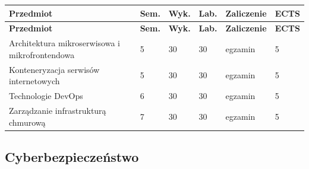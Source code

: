 \documentclass[12pt,a4paper]{article}
\newcommand{\thdrule}{\noalign{\global\setlength{\extrarowheight}{0pt}}}
\newcommand{\thdend}{\noalign{\global\setlength{\extrarowheight}{4pt}}}
\begin{document}
{\scriptsize
\begin{longtable}{m{6.5cm}m{0.7cm}m{1cm}m{1cm}m{1.7cm}m{0.7cm}}
\thdrule\toprule
\rowcolor{pjatkRed}
{\color{white}\footnotesize\textbf{\vphantom{Ag}Przedmiot}} & {\color{white}\footnotesize\textbf{\vphantom{Ag}Sem.}} & {\color{white}\footnotesize\textbf{\vphantom{Ag}Wyk.}} & {\color{white}\footnotesize\textbf{\vphantom{Ag}Lab.}} & {\color{white}\footnotesize\textbf{\vphantom{Ag}Zaliczenie}} & {\color{white}\footnotesize\textbf{\vphantom{Ag}ECTS}} \\
\midrule\thdend
\endfirsthead
\thdrule\toprule
\rowcolor{pjatkRed}
{\color{white}\footnotesize\textbf{\vphantom{Ag}Przedmiot}} & {\color{white}\footnotesize\textbf{\vphantom{Ag}Sem.}} & {\color{white}\footnotesize\textbf{\vphantom{Ag}Wyk.}} & {\color{white}\footnotesize\textbf{\vphantom{Ag}Lab.}} & {\color{white}\footnotesize\textbf{\vphantom{Ag}Zaliczenie}} & {\color{white}\footnotesize\textbf{\vphantom{Ag}ECTS}} \\
\midrule\thdend
\endhead
\rowcolor{tableRowLight} Architektura mikroserwisowa i mikrofrontendowa & 5 & 30 & 30 & {\scriptsize egzamin} & 5 \\
\rowcolor{tableRowAlt} Konteneryzacja serwisów internetowych & 5 & 30 & 30 & {\scriptsize egzamin} & 5 \\
\rowcolor{tableRowLight} Technologie DevOps & 6 & 30 & 30 & {\scriptsize egzamin} & 5 \\
\rowcolor{tableRowAlt} Zarządzanie infrastrukturą chmurową & 7 & 30 & 30 & {\scriptsize egzamin} & 5 \\
\bottomrule
\end{longtable}}

\subsection*{Cyberbezpieczeństwo}
\end{document}
